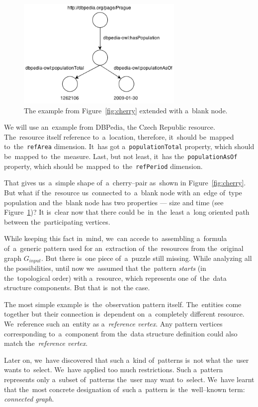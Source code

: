 \begin{figure}
	\centering
	\includegraphics[width=80mm]{images/cherry_blank.png}
	\caption{The example from Figure~\ref{fig:cherry} extended with a~blank node.}
	\label{fig:cherry-blank}
\end{figure}

We will use an~example from DBPedia, 
the Czech Republic resource. The~resource itself reference to~a~location, 
therefore, it~should be~mapped to~the~\verb|refArea| dimension. It~has got a~\verb|populationTotal| property, which should be~mapped to~the~measure. Last, but not 
least, it~has the~\verb|populationAsOf| property, which should be~mapped to~the~\verb|refPeriod| dimension.

That gives us~a~simple shape of~a~cherry--pair as~shown in
Figure~\ref{fig:cherry}. But what 
if the~resource us~connected to~a~blank node with an~edge of~type 
population and the~blank node has two properties --- size and time
(see Figure~\ref{fig:cherry-blank})?
It is~clear now that there could be~in~the~least a~long oriented path between the~participating 
vertices.

While keeping this fact in~mind, we~can accede to~assembling a~formula of~a~generic pattern used for an~extraction of~the~resources from the~original graph $G_{input}$. But 
there is~one piece of~a~puzzle still missing. While analyzing all the
possibilities, until now we~assumed that the~pattern \emph{starts} (in the~topological order)
with a~resource, which represents one of~the~data structure components. But that is~not  
the case.

The most simple example is~the~observation pattern itself. The~entities come together but their connection is~dependent on~a~completely 
different resource. We~reference such an~entity
as a~\emph{reference vertex}. Any pattern vertices corresponding to~a~component from the~data structure definition could also match the~\emph{reference vertex}.

Later on, we~have discovered that such a~kind of~patterns is~not what the~user 
wants to~select. We~have applied too much restrictions. Such a~pattern
represents only a~subset of~patterns the~user may want to~select. We~have learnt
that the~most concrete designation of~such a~pattern is~the~well--known term:
\emph{connected graph}.

